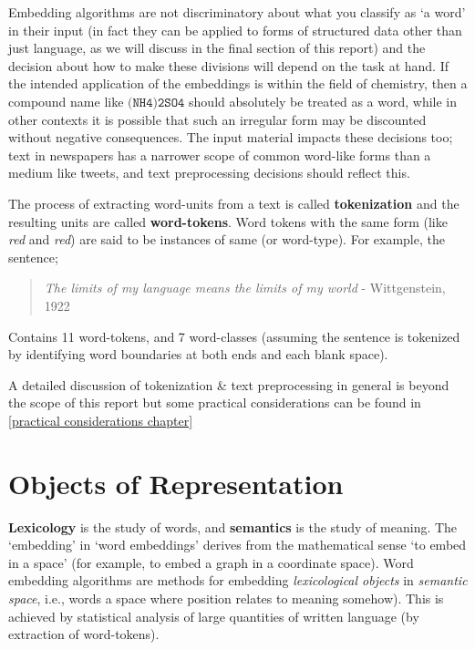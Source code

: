 Embedding algorithms are not discriminatory about what you classify as `a word' in their input (in fact they can be applied to forms of structured data other than just language, as we will discuss in the final section of this report) and the decision about how to make these divisions will depend on the task at hand. If the intended application of the embeddings is within the field of chemistry, then a compound name like $\texttt{(NH4)2SO4}$ should absolutely be treated as a word, while in other contexts it is possible that such an irregular form may be discounted without negative consequences. The input material impacts these decisions too; text in newspapers has a narrower scope of common word-like forms than a medium like tweets, and text preprocessing decisions should reflect this.

The process of extracting word-units from a text is called \textbf{tokenization} and the resulting units are called \textbf{word-tokens}. Word tokens with the same form (like \emph{red} and \emph{red}) are said to be instances of same  (or word-type). For example, the sentence;

\begin{quote}
  \emph{The limits of my language means the limits of my world} - Wittgenstein, 1922
\end{quote}

Contains 11 word-tokens, and 7 word-classes (assuming the sentence is tokenized by identifying word boundaries at both ends and each blank space).

A detailed discussion of tokenization \& text preprocessing in general is beyond the scope of this report but some practical considerations can be found in \autoref{practical considerations chapter}

\section{Objects of Representation}
\textbf{Lexicology} is the study of words, and \textbf{semantics} is the study of meaning. The `embedding' in `word embeddings' derives from the mathematical sense `to embed in a space' (for example, to embed a graph in a coordinate space). Word embedding algorithms are methods for embedding \emph{lexicological objects} in \emph{semantic space}, i.e., words a space where position relates to meaning somehow). This is achieved by statistical analysis of large quantities of written language (by extraction of word-tokens).

